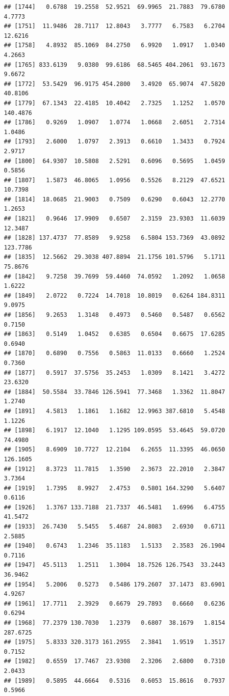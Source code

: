 \documentclass{article}\usepackage[]{graphicx}\usepackage[]{color}
\makeatletter
\newenvironment{kframe}{%
 \def\at@end@of@kframe{}%
 \ifinner\ifhmode%
  \def\at@end@of@kframe{\end{minipage}}%
  \begin{minipage}{\columnwidth}%
 \fi\fi%
 \def\FrameCommand##1{\hskip\@totalleftmargin \hskip-\fboxsep
 \colorbox{shadecolor}{##1}\hskip-\fboxsep
     \hskip-\linewidth \hskip-\@totalleftmargin \hskip\columnwidth}%
 \MakeFramed {\advance\hsize-\width
   \@totalleftmargin\z@ \linewidth\hsize
   \@setminipage}}%
 {\par\unskip\endMakeFramed%
 \at@end@of@kframe}
\newenvironment{knitrout}{}{} %
\makeatother
\begin{document}
\begin{knitrout}
\begin{kframe}
\begin{verbatim}
## [1744]   0.6788  19.2558  52.9521  69.9965  21.7883  79.6780   4.7773
## [1751]  11.9486  28.7117  12.8043   3.7777   6.7583   6.2704  12.6216
## [1758]   4.8932  85.1069  84.2750   6.9920   1.0917   1.0340   4.2663
## [1765] 833.6139   9.0380  99.6186  68.5465 404.2061  93.1673   9.6672
## [1772]  53.5429  96.9175 454.2800   3.4920  65.9074  47.5820  40.8106
## [1779]  67.1343  22.4185  10.4042   2.7325   1.1252   1.0570 140.4876
## [1786]   0.9269   1.0907   1.0774   1.0668   2.6051   2.7314   1.0486
## [1793]   2.6000   1.0797   2.3913   0.6610   1.3433   0.7924   2.9717
## [1800]  64.9307  10.5808   2.5291   0.6096   0.5695   1.0459   0.5856
## [1807]   1.5873  46.8065   1.0956   0.5526   8.2129  47.6521  10.7398
## [1814]  18.0685  21.9003   0.7509   0.6290   0.6043  12.2770   1.2653
## [1821]   0.9646  17.9909   0.6507   2.3159  23.9303  11.6039  12.3487
## [1828] 137.4737  77.8589   9.9258   6.5804 153.7369  43.0892 123.7786
## [1835]  12.5662  29.3038 407.8894  21.1756 101.5796   5.1711  75.8676
## [1842]   9.7258  39.7699  59.4460  74.0592   1.2092   1.0658   1.6222
## [1849]   2.0722   0.7224  14.7018  10.8019   0.6264 184.8311   9.0975
## [1856]   9.2653   1.3148   0.4973   0.5460   0.5487   0.6562   0.7150
## [1863]   0.5149   1.0452   0.6385   0.6504   0.6675  17.6285   0.6940
## [1870]   0.6890   0.7556   0.5863  11.0133   0.6660   1.2524   0.7360
## [1877]   0.5917  37.5756  35.2453   1.0309   8.1421   3.4272  23.6320
## [1884]  50.5584  33.7846 126.5941  77.3468   1.3362  11.8047   1.2740
## [1891]   4.5813   1.1861   1.1682  12.9963 387.6810   5.4548   1.1226
## [1898]   6.1917  12.1040   1.1295 109.0595  53.4645  59.0720  74.4980
## [1905]   8.6909  10.7727  12.2104   6.2655  11.3395  46.0650 126.1605
## [1912]   8.3723  11.7815   1.3590   2.3673  22.2010   2.3847   3.7364
## [1919]   1.7395   8.9927   2.4753   0.5801 164.3290   5.6407   0.6116
## [1926]   1.3767 133.7188  21.7337  46.5481   1.6996   6.4755  41.5472
## [1933]  26.7430   5.5455   5.4687  24.8083   2.6930   0.6711   2.5885
## [1940]   0.6743   1.2346  35.1183   1.5133   2.3583  26.1904   0.7116
## [1947]  45.5113   1.2511   1.3004  18.7526 126.7543  33.2443  36.9462
## [1954]   5.2006   0.5273   0.5486 179.2607  37.1473  83.6901   4.9267
## [1961]  17.7711   2.3929   0.6679  29.7893   0.6660   0.6236   0.6294
## [1968]  77.2379 130.7030   1.2379   0.6807  38.1679   1.8154 287.6725
## [1975]   5.8333 320.3173 161.2955   2.3841   1.9519   1.3517   0.7152
## [1982]   0.6559  17.7467  23.9308   2.3206   2.6800   0.7310   2.0433
## [1989]   0.5895  44.6664   0.5316   0.6053  15.8616   0.7937   0.5966

\end{verbatim}
\end{kframe}
\end{knitrout}
\end{document}
